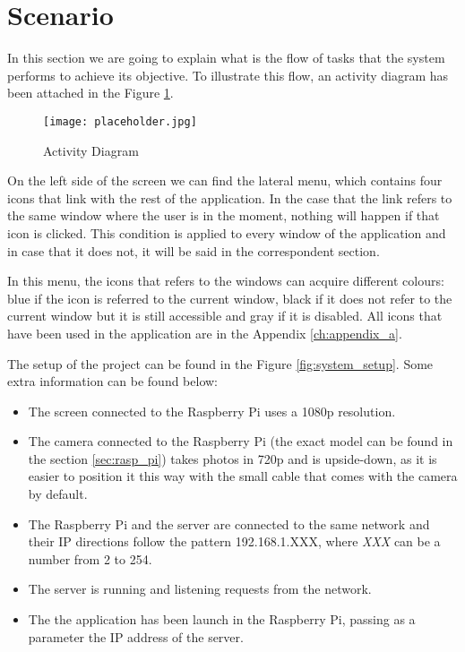 \section{Scenario}
\label{sec:scenario}

In this section we are going to explain what is the flow of tasks that the system performs to achieve its objective. To illustrate this flow, an activity diagram has been attached in the Figure \ref{fig:activity_diagram}. 

\begin{figure}[!ht]
	\centering
	\texttt{[image: placeholder.jpg]}
	\caption{Activity Diagram}
	\label{fig:activity_diagram}
\end{figure}	

On the left side of the screen we can find the lateral menu, which contains four icons that link with the rest of the application. In the case that the link refers to the same window where the user is in the moment, nothing will happen if that icon is clicked. This condition is applied to every window of the application and in case that it does not, it will be said in the correspondent section.

In this menu, the icons that refers to the windows can acquire different colours: blue if the icon is referred to the current window, black if it does not refer to the current window but it is still accessible and gray if it is disabled. All icons that have been used in the application are in the Appendix \ref{ch:appendix_a}.

The setup of the project can be found in the Figure \ref{fig:system_setup}. Some extra information can be found below:

\begin{itemize} 
	\item The screen connected to the Raspberry Pi uses a \gls{1080p} resolution.
	\item The camera connected to the Raspberry Pi (the exact model can be found in the section \ref{sec:rasp_pi}) takes photos in \gls{720p} and is upside-down, as it is easier to position it this way with the small cable that comes with the camera by default. 
	\item The Raspberry Pi and the server are connected to the same network and their IP directions follow the pattern 192.168.1.XXX, where \textit{XXX} can be a number from 2 to 254.
	\item The server is running and listening requests from the network.
	\item The the application has been launch in the Raspberry Pi, passing as a parameter the IP address of the server. 
\end{itemize}



